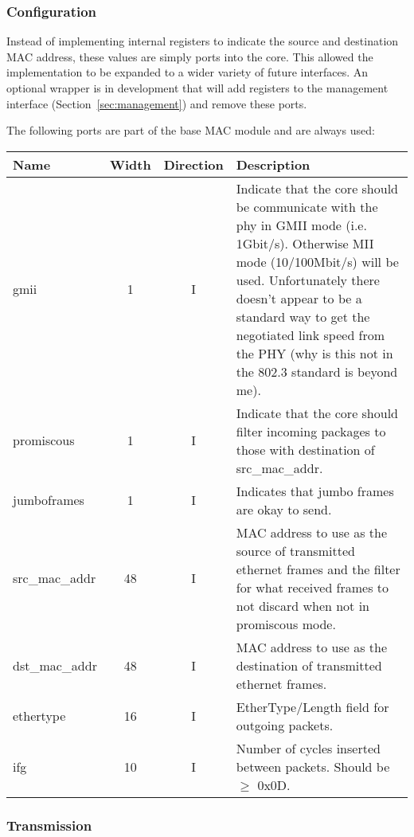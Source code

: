 \documentclass[11pt]{article}
\begin{document}
\subsubsection{Configuration}

Instead of implementing internal registers to indicate the source and
destination MAC address, these values are simply ports into the core.
This allowed the implementation to be expanded to a wider variety of
future interfaces.  An optional wrapper is in development that will
add registers to the management interface
(Section~\ref{sec:management}) and remove these ports.

The following ports are part of the base MAC module and are always used:
\begin{tabular}{p{0.85in}ccp{4.0in}}
\hline
Name & Width & Direction & Description \\
\hline

\hline gmii & 1 & I & Indicate that the core should be communicate
with the phy in GMII mode (i.e. 1Gbit/s).  Otherwise MII mode
(10/100Mbit/s) will be used. Unfortunately there doesn't appear to be
a standard way to get the negotiated link speed from the PHY (why is
this not in the 802.3 standard is beyond me). \\

\hline promiscous & 1 & I & Indicate that the core should filter
incoming packages to those with destination of src\_mac\_addr. \\

\hline jumboframes & 1 & I & Indicates that jumbo frames are okay to
send. \\

\hline src\_mac\_addr & 48 & I & MAC address to use as the source of
transmitted ethernet frames and the filter for what received frames to
not discard when not in promiscous mode. \\

\hline dst\_mac\_addr & 48 & I & MAC address to use as the destination
of transmitted ethernet frames. \\

\hline ethertype & 16 & I & EtherType/Length field for outgoing packets. \\

\hline ifg & 10 & I & Number of cycles inserted between packets.  Should be $\geq$ 0x0D. \\

\hline
\end{tabular}

\subsubsection{Transmission}
\label{sec:tx-iface}
\end{document}
